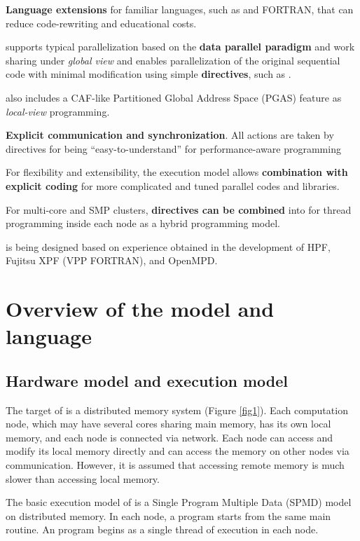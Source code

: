 \begin{description}
\item {\bf Language extensions} for familiar languages, such as \C and FORTRAN,
  that can reduce code-rewriting and educational costs.
\item \XMP supports typical parallelization based on the {\bf data parallel
  paradigm} and work sharing under {\it global view} and enables
  parallelization of the original sequential code with minimal
  modification using simple {\bf directives}, such as \OMP. 
\item \XMP also includes a CAF-like Partitioned
Global Address Space (PGAS) feature as {\it local-view} programming. 
\item {\bf Explicit communication and synchronization}. All actions
  are taken by directives for being ``easy-to-understand'' for
  performance-aware programming 
\item For flexibility and extensibility, the execution model
allows {\bf combination with explicit \MPI coding} for more complicated
and tuned parallel codes and libraries. 
\item For multi-core and SMP clusters,
{\bf \OMP directives can be combined} into \XMP for thread
programming inside each node as a hybrid programming
model.
\end{description}

\XMP is being designed based on experience obtained in the development of HPF, Fujitsu XPF
(VPP FORTRAN), and OpenMPD.  

\chapter{Overview of the \XMP model and language}

\section{Hardware model and execution model}

The target of \XMP is a distributed memory system
(Figure \ref{fig1}). Each computation node, which may have
several cores sharing main 
memory, has its own local memory, and each node is connected via
network. Each node can access and modify its local memory directly
and can access the memory on other nodes via communication. However, it is assumed that accessing remote memory is much slower than
accessing local memory.

The basic execution model of
\XMP is a Single Program Multiple Data (SPMD) model on
distributed memory. In each node, a program starts from the same main
routine. An \XMP program begins as a single thread of execution
in each node. 


